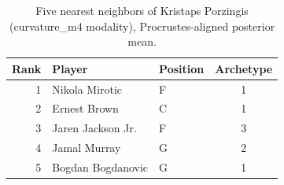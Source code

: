 \begin{table}[htbp]
  \centering\small
  \begin{tabular}{rllc}
    \toprule
    Rank & Player & Position & Archetype \\
    \midrule
    1 & Nikola Mirotic & F & 1 \\
    2 & Ernest Brown & C & 1 \\
    3 & Jaren Jackson Jr. & F & 3 \\
    4 & Jamal Murray & G & 2 \\
    5 & Bogdan Bogdanovic & G & 1 \\
    \bottomrule
  \end{tabular}
  \caption{Five nearest neighbors of Kristaps Porzingis (curvature_m4 modality), Procrustes-aligned posterior mean.}
  \label{tab:Kristaps_Porzingis_neighbors_curvature_m4}
\end{table}

